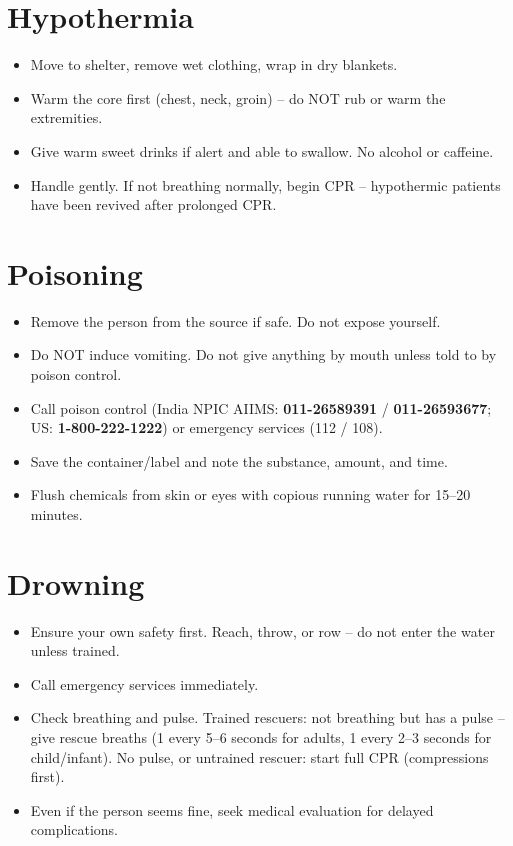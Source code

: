 \section{Hypothermia}

\begin{itemize}[leftmargin=*]
\item Move to shelter, remove wet clothing, wrap in dry blankets.
\item Warm the core first (chest, neck, groin) -- do NOT rub or warm the extremities.
\item Give warm sweet drinks if alert and able to swallow. No alcohol or caffeine.
\item Handle gently. If not breathing normally, begin CPR -- hypothermic patients have been revived after prolonged CPR.
\end{itemize}

\section{Poisoning}

\begin{itemize}[leftmargin=*]
\item Remove the person from the source if safe. Do not expose yourself.
\item Do NOT induce vomiting. Do not give anything by mouth unless told to by poison control.
\item Call poison control (India NPIC AIIMS: \textbf{011-26589391} / \textbf{011-26593677}; US: \textbf{1-800-222-1222}) or emergency services (112 / 108).
\item Save the container/label and note the substance, amount, and time.
\item Flush chemicals from skin or eyes with copious running water for 15--20 minutes.
\end{itemize}

\section{Drowning}

\begin{itemize}[leftmargin=*]
\item Ensure your own safety first. Reach, throw, or row -- do not enter the water unless trained.
\item Call emergency services immediately.
\item Check breathing and pulse. Trained rescuers: not breathing but has a pulse -- give rescue breaths (1 every 5--6 seconds for adults, 1 every 2--3 seconds for child/infant). No pulse, or untrained rescuer: start full CPR (compressions first).
\item Even if the person seems fine, seek medical evaluation for delayed complications.
\end{itemize}

